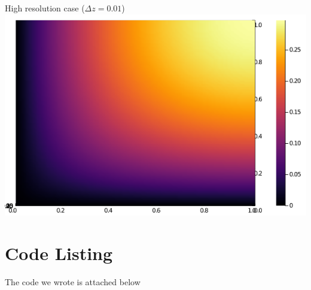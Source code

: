 \documentclass[11pt]{article}
\begin{document}
	\begin{center}
		High resolution case ($ \Delta z = 0.01 $)
		\includegraphics[scale=0.5]{2D_high_res.png}
	\end{center}
	
	\section{Code Listing}
	The code we wrote is attached below
	\begin{lstlisting}

	\end{lstlisting}
\end{document}
